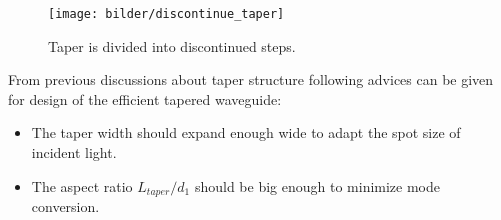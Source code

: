 \begin{figure}[!ht]
\centering
\texttt{[image: bilder/discontinue\_taper]}
\caption{Taper is divided into discontinued steps.}
\label{fig: discontinue_taper}
\end{figure}

From previous discussions about taper structure following advices can be given for design of the efficient tapered waveguide:
\begin{itemize}
\item The taper width should expand enough wide to adapt the spot size of  incident light. 
\item The aspect ratio $L_{taper}/d_{1}$ should be big enough to minimize mode conversion.
\end{itemize} 
